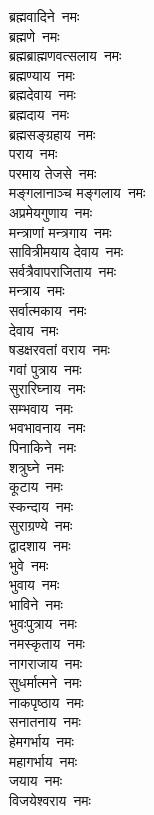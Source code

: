 \begin{multicols}{2}
\begin{flushleft}
ब्रह्मवादिने~नमः\\
ब्रह्मणे~नमः\\
ब्रह्मब्राह्मणवत्सलाय~नमः\\
ब्रह्मण्याय~नमः\\
ब्रह्मदेवाय~नमः\\
ब्रह्मदाय~नमः\\
ब्रह्मसङ्ग्रहाय~नमः\\
पराय~नमः\\
परमाय तेजसे~नमः\\
मङ्गलानाञ्च मङ्गलाय~नमः\hfill{}\\
अप्रमेयगुणाय~नमः\\
मन्त्राणां मन्त्रगाय~नमः\\
सावित्रीमयाय देवाय~नमः\\
सर्वत्रैवापराजिताय~नमः\\
मन्त्राय~नमः\\
सर्वात्मकाय~नमः\\
देवाय~नमः\\
षडक्षरवतां वराय~नमः\\
गवां पुत्राय~नमः\\
सुरारिघ्नाय~नमः\hfill{}\\
सम्भवाय~नमः\\
भवभावनाय~नमः\\
पिनाकिने~नमः\\
शत्रुघ्ने~नमः\\
कूटाय~नमः\\
स्कन्दाय~नमः\\
सुराग्रण्ये~नमः\\
द्वादशाय~नमः\\
भुवे~नमः\\
भुवाय~नमः\hfill{}\\
भाविने~नमः\\
भुवःपुत्राय~नमः\\
नमस्कृताय~नमः\\
नागराजाय~नमः\\
सुधर्मात्मने~नमः\\
नाकपृष्ठाय~नमः\\
सनातनाय~नमः\\
हेमगर्भाय~नमः\\
महागर्भाय~नमः\\
जयाय~नमः\hfill{}\\
विजयेश्वराय~नमः\\

\end{flushleft}
\end{multicols}
